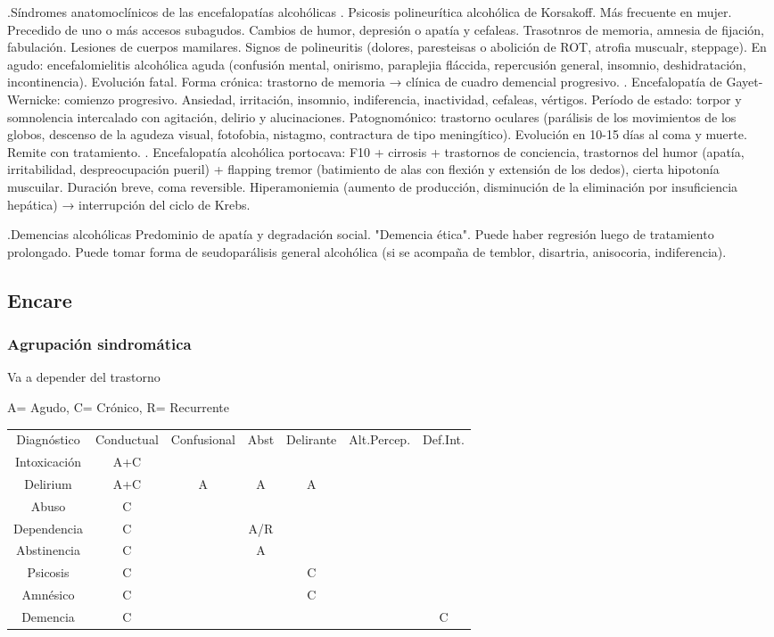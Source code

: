 \documentclass[encares.tex]{subfiles}
\begin{document}
.Síndromes anatomoclínicos de las encefalopatías alcohólicas
. Psicosis polineurítica alcohólica de Korsakoff. Más frecuente en mujer. Precedido de uno o más accesos subagudos. Cambios de humor, depresión o apatía y cefaleas. Trasotnros de memoria, amnesia de fijación, fabulación. Lesiones de cuerpos mamilares. Signos de polineuritis (dolores, paresteisas o abolición de ROT, atrofia muscualr, steppage). En agudo: encefalomielitis alcohólica aguda (confusión mental, onirismo, paraplejia fláccida, repercusión general, insomnio, deshidratación, incontinencia). Evolución fatal. Forma crónica: trastorno de memoria → clínica de cuadro demencial progresivo.
. Encefalopatía de Gayet-Wernicke: comienzo progresivo. Ansiedad, irritación, insomnio, indiferencia, inactividad, cefaleas, vértigos. Período de estado: torpor y somnolencia intercalado con agitación, delirio y alucinaciones. Patognomónico: trastorno oculares (parálisis de los movimientos de los globos, descenso de la agudeza visual, fotofobia, nistagmo, contractura de tipo meningítico). Evolución en 10-15 días al coma y muerte. Remite con tratamiento.
. Encefalopatía alcohólica portocava: F10 + cirrosis + trastornos de conciencia, trastornos del humor (apatía, irritabilidad, despreocupación pueril) + flapping tremor (batimiento de alas con flexión y extensión de los dedos), cierta hipotonía muscuilar. Duración breve, coma reversible. Hiperamoniemia (aumento de producción, disminución de la eliminación por insuficiencia hepática) → interrupción del ciclo de Krebs.

.Demencias alcohólicas
Predominio de apatía y degradación social. "Demencia ética". Puede haber regresión luego de tratamiento prolongado. Puede tomar forma de seudoparálisis general alcohólica (si se acompaña de temblor, disartria, anisocoria, indiferencia).
\subsection*{Encare}
\subsubsection*{Agrupación sindromática}
Va a depender del trastorno

A= Agudo, C= Crónico, R= Recurrente
\begin{center}
\begin{tabular}{|c|c|c|c|c|c|c|}
\hline
Diagnóstico & Conductual & Confusional & Abst & Delirante & Alt.Percep. & Def.Int.\\
Intoxicación & A+C &  & & &\\
Delirium & A+C & A & A & A\\
Abuso & C & & & &\\
Dependencia & C &  & A/R & & \\
Abstinencia & C & & A\\
Psicosis & C & & & C\\
Amnésico & C & & & C\\
Demencia & C & & & & & C\\
\hline
\end{tabular}
\end{center}
\end{document}
